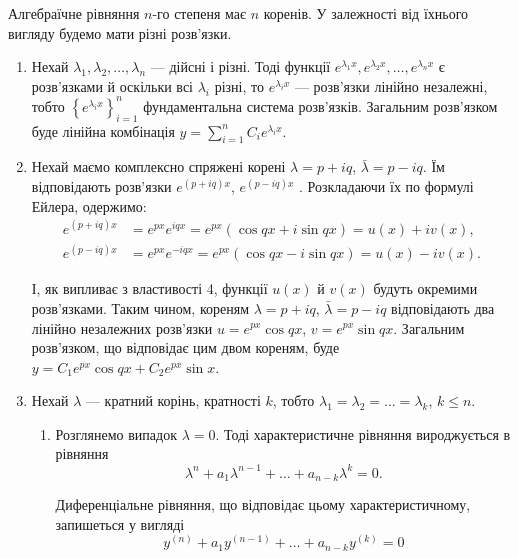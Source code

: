 Алгебраїчне рівняння $n$-го степеня має $n$ коренів. У залежності від їхнього вигляду будемо мати різні розв'язки.
\begin{enumerate}
    \item Нехай $\lambda_1, \lambda_2, \ldots, \lambda_n$ --- дійсні і різні. Тоді функції $e^{\lambda_1 x}, e^{\lambda_2 x}, \ldots, e^{\lambda_n x}$ є розв'язками й оскільки всі $\lambda_i$ різні, то $e^{\lambda_i x}$ --- розв'язки лінійно незалежні, тобто $\left\{ e^{\lambda_i x} \right\}_{i = 1}^n$ фундаментальна система розв'язків. Загальним розв'язком буде лінійна комбінація $y = \sum_{i=1}^n C_i e^{\lambda_i x}$.

    \item Нехай маємо комплексно спряжені корені $\lambda=p+iq$, $\bar\lambda=p-iq$. Їм відповідають розв'язки $e^{(p+iq)x}$, $e^{(p-iq)x}$ . Розкладаючи їх по формулі Ейлера, одержимо: 
    \begin{align*}
    	e^{(p+iq)x} &= e^{px} e^{iqx} = e^{px} (\cos qx + i \sin qx) = u(x) + i v(x), \\
    	e^{(p-iq)x} &= e^{px} e^{-iqx} = e^{px} (\cos qx - i \sin qx) = u(x) - i v(x).
    \end{align*}
    
    І, як випливає з властивості 4, функції $u(x)$ й $v(x)$ будуть окремими розв'язками. Таким чином, кореням $\lambda = p + iq$, $\bar\lambda = p - iq$ відповідають два лінійно незалежних розв'язки $u = e^{px} \cos qx$, $v = e^{px} \sin qx$. Загальним розв'язком, що відповідає цим двом кореням, буде $y = C_1 e^{px} \cos qx + C_2 e^{px} \sin x$.
    
    \item Нехай $\lambda$ --- кратний корінь, кратності $k$, тобто $\lambda_1 = \lambda_2 = \ldots = \lambda_k$, $k\le n$.
    
    \begin{enumerate}
        \item Розглянемо випадок $\lambda=0$. Тоді характеристичне рівняння вироджується в рівняння
        \begin{equation*}
        	\lambda^n + a_1 \lambda^{n - 1} + \ldots + a_{n - k} \lambda^k = 0.
        \end{equation*}
         
        Диференціальне рівняння, що відповідає цьому характеристичному, запишеться у вигляді
        \begin{equation*}
        	y^{(n)} + a_1 y^{(n - 1)} + \ldots + a_{n-k} y^{(k)} = 0
        \end{equation*}
        

\end{enumerate}
\end{enumerate}
